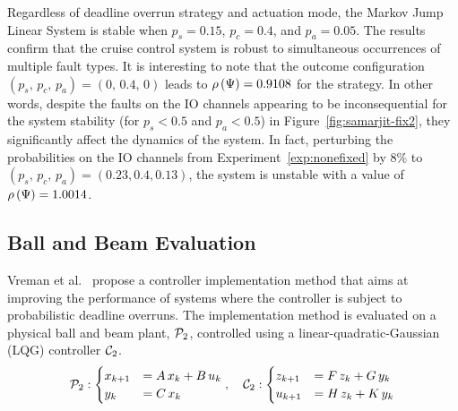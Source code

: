 Regardless of deadline overrun strategy and actuation mode, the Markov Jump Linear System is stable when $p_s=0.15$, $p_c=0.4$, and $p_a=0.05$.
The results confirm that the cruise control system is robust to simultaneous occurrences of multiple fault types.
It is interesting to note that the outcome configuration $(p_s,\, p_c,\, p_a) = (0,\, 0.4,\, 0)$ leads to $\rho\left( \Psi \right) = 0.9108$ for the \tSH{} strategy.
In other words, despite the faults on the IO channels appearing to be inconsequential for the system stability (for $p_s < 0.5$ and $p_a < 0.5$) in Figure~\ref{fig:samarjit-fix2}, they significantly affect the dynamics of the system.
In fact, perturbing the probabilities on the IO channels from Experiment~\ref{exp:nonefixed} by 8\% to $(p_s,\, p_c,\, p_a) = (0.23, 0.4, 0.13)$, the system is unstable with a value of $\rho\left( \Psi \right) = 1.0014$.

%

\subsection{Ball and Beam Evaluation}%
\label{sec:nils}%
%
Vreman et al.~\cite{Vreman:2022} propose a controller implementation method that aims at improving the performance of systems where the controller is subject to probabilistic deadline overruns.
The implementation method is evaluated on a physical ball and beam plant, $\mathcal{P}_2$, controlled using a linear-quadratic-Gaussian (LQG) controller $\mathcal{C}_2$.
%
\begin{equation*}
    \mathcal{P}_2: \begin{cases}
        x_{k+1} &= A\,x_k+B\, u_k\\
        y_k &= C\,x_k
    \end{cases},\quad
    \mathcal{C}_2: \begin{cases}
        z_{k+1} &= F\,z_k+G\, y_k\\
        u_{k+1} &= H\,z_k+K\,y_k
    \end{cases}
\end{equation*}

